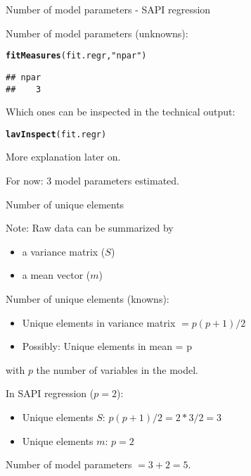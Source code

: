 \documentclass[10pt]{beamer}\usepackage[]{graphicx}\usepackage[]{xcolor}
\makeatletter
\newcommand{\hlsng}[1]{\textcolor[rgb]{0.192,0.494,0.8}{#1}}%
\newcommand{\hldef}[1]{\textcolor[rgb]{0.345,0.345,0.345}{#1}}%
\newcommand{\hlkwd}[1]{\textcolor[rgb]{0.737,0.353,0.396}{\textbf{#1}}}%
\newenvironment{kframe}{%
 \def\at@end@of@kframe{}%
 \ifinner\ifhmode%
  \def\at@end@of@kframe{\end{minipage}}%
  \begin{minipage}{\columnwidth}%
 \fi\fi%
 \def\FrameCommand##1{\hskip\@totalleftmargin \hskip-\fboxsep
 \colorbox{shadecolor}{##1}\hskip-\fboxsep
     \hskip-\linewidth \hskip-\@totalleftmargin \hskip\columnwidth}%
 \MakeFramed {\advance\hsize-\width
   \@totalleftmargin\z@ \linewidth\hsize
   \@setminipage}}%
 {\par\unskip\endMakeFramed%
 \at@end@of@kframe}
\newenvironment{knitrout}{}{} %
\makeatother
\begin{document}
%
\begin{frame}[fragile]{Number of model parameters - SAPI regression}

Number of model parameters (unknowns):
\begin{knitrout}
\color{fgcolor}\begin{kframe}
\begin{alltt}
\hlkwd{fitMeasures}\hldef{(fit.regr,} \hlsng{"npar"}\hldef{)}
\end{alltt}
\begin{verbatim}
## npar 
##    3
\end{verbatim}
\end{kframe}
\end{knitrout}

\vspace{5mm}

Which ones can be inspected in the technical output:
\begin{knitrout}
\color{fgcolor}\begin{kframe}
\begin{alltt}
\hlkwd{lavInspect}\hldef{(fit.regr)}
\end{alltt}
\end{kframe}
\end{knitrout}
More explanation later on.

\vspace{5mm}

For now: 3 model parameters estimated.

\end{frame}
%
\begin{frame}{Number of unique elements}

Note: Raw data can be summarized by
\begin{itemize}
\item{a variance matrix ($S$)}
\item{a mean vector ($m$)}
\end{itemize}

\vspace{5mm}

Number of unique elements (knowns):
\begin{itemize}
\item{Unique elements in variance matrix $= p(p+1)/2$}
\item{Possibly: Unique elements in mean = p}
\end{itemize}
with $p$ the number of variables in the model.

\vspace{5mm}

In SAPI regression ($p = 2$):\\
\begin{itemize}
\item{Unique elements $S$: $p(p+1)/2 = 2*3/2 = 3$}
\item{Unique elements $m$: $p = 2$}
\end{itemize}
Number of model parameters $= 3+2 = 5$. 

\end{frame}
\end{document}
